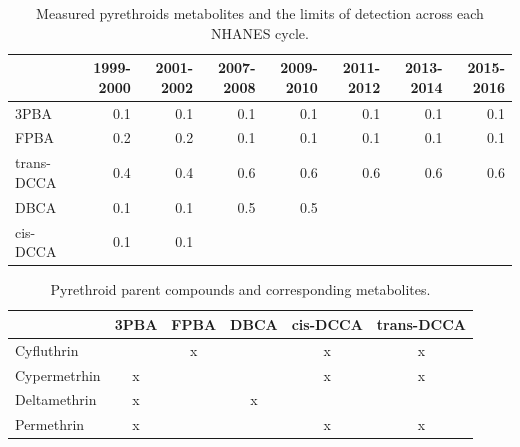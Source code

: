 \documentclass[toxics,article,submit,pdftex,moreauthors]{Definitions/mdpi}
\begin{document}
\begin{table}[H]
\begin{adjustwidth}{-4cm}{}
\caption{Measured pyrethroids metabolites and the limits of detection across each NHANES cycle.}
\label{tab:taba1}
\begin{tabular}{lrrrrrrr}
\toprule
  & 1999-2000 & 2001-2002 & 2007-2008 & 2009-2010 & 2011-2012 & 2013-2014 & 2015-2016\\
\midrule
3PBA & 0.1 & 0.1 & 0.1 & 0.1 & 0.1 & 0.1 & 0.1\\
FPBA & 0.2 & 0.2 & 0.1 & 0.1 & 0.1 & 0.1 & 0.1\\
trans-DCCA & 0.4 & 0.4 & 0.6 & 0.6 & 0.6 & 0.6 & 0.6\\
DBCA & 0.1 & 0.1 & 0.5 & 0.5 &  &  & \\
cis-DCCA & 0.1 & 0.1 &  &  &  &  & \\
\bottomrule
\end{tabular}
\end{adjustwidth}
\end{table}


\begin{table}[H]
\begin{adjustwidth}{-4cm}{}
\caption{\label{tab:taba2}Pyrethroid parent compounds and corresponding metabolites.}
\begin{tabular}[t]{lccccc}
\toprule
  & 3PBA & FPBA & DBCA & cis-DCCA & trans-DCCA\\
\midrule
Cyfluthrin &  & x &  & x & x\\
Cypermetrhin & x &  &  & x & x\\
Deltamethrin & x &  & x &  & \\
Permethrin & x &  &  & x & x\\
\bottomrule
\end{tabular}
\end{adjustwidth}
\end{table}
\end{document}
